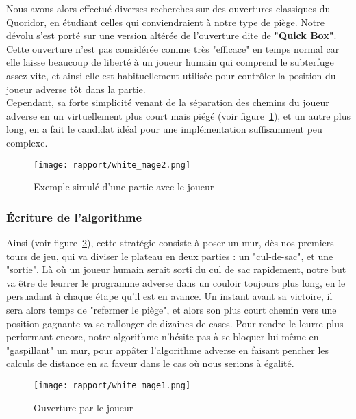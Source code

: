 \documentclass[a4paper]{article}
\begin{document}
Nous avons alors effectué diverses recherches sur des ouvertures classiques\cite{openings} du Quoridor, en étudiant celles qui conviendraient à notre type de piège. Notre dévolu s'est porté sur une version altérée de l'ouverture dite de \textbf{"Quick Box"}\cite{quickbox}. Cette ouverture n'est pas considérée comme très "efficace" en temps normal car elle laisse beaucoup de liberté à un joueur humain qui comprend le subterfuge assez vite, et ainsi elle est habituellement utilisée pour contrôler la position du joueur adverse tôt dans la partie. \\

Cependant, sa forte simplicité venant de la séparation des chemins du joueur adverse en un virtuellement plus court mais piégé (voir figure~\ref{fig:quickbox}), et un autre plus long, en a fait le candidat idéal pour une implémentation suffisamment peu complexe. 

\clearpage
\begin{figure}[ht]
    \centering
    \texttt{[image: rapport/white\_mage2.png]}
    \caption{Exemple simulé d'une partie avec le joueur }
    \label{fig:quickbox}
\end{figure}

\subsubsection{Écriture de l'algorithme}

Ainsi (voir figure~\ref{fig:trapsetup}), cette stratégie consiste à poser un mur, dès nos premiers tours de jeu, qui va diviser le plateau en deux parties : un "cul-de-sac", et une "sortie". Là où un joueur humain serait sorti du cul de sac rapidement, notre but va être de leurrer le programme adverse dans un couloir toujours plus long, en le persuadant à chaque étape qu'il est en avance. Un instant avant sa victoire, il sera alors temps de "refermer le piège", et alors son plus court chemin vers une position gagnante va se rallonger de dizaines de cases. Pour rendre le leurre plus performant encore, notre algorithme n'hésite pas à se bloquer lui-même en "gaspillant" un mur, pour appâter l'algorithme adverse en faisant pencher les calculs de distance en sa faveur dans le cas où nous serions à égalité.\\

\begin{figure}[ht]
    \centering
    \texttt{[image: rapport/white\_mage1.png]}
    \caption{Ouverture par le joueur }
    \label{fig:trapsetup}
\end{figure}
\end{document}
